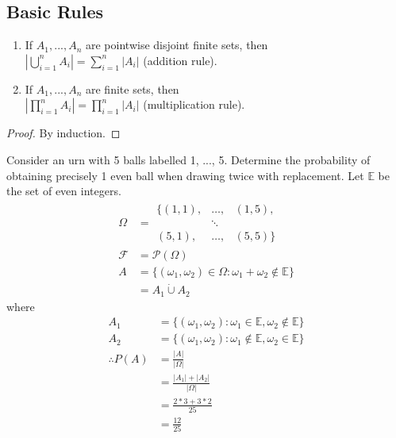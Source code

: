 \documentclass{article}
\begin{document}
	\subsection{Basic Rules}
	
	\begin{myprop}{}{}
		\begin{enumerate}
			\item If $A_1, ..., A_n$ are pointwise disjoint finite sets, then\\
			$|\bigcup_{i=1}^{n}A_i|=\sum_{i=1}^{n}|A_i|$ (addition rule).
			\item If $A_1, ..., A_n$ are finite sets, then\\
			$|\prod_{i=1}^{n}A_i|=\prod_{i=1}^{n}|A_i|$ (multiplication rule).
		\end{enumerate}
		
		\begin{proof}
			By induction.
		\end{proof}
	\end{myprop}
	
	\begin{myex}{}{}
		Consider an urn with 5 balls labelled 1, ..., 5. Determine the probability of obtaining precisely 1 even ball when drawing twice with replacement. Let $\mathbb{E}$ be the set of even integers.
		\begin{align*}
			\Omega&=\begin{matrix}
				\{(1, 1), & \dots, & (1, 5),\\
				& \ddots & \\
				(5, 1), & \dots, & (5, 5)\}
				\end{matrix}\\
			\mathcal{F}&=\mathcal{P}(\Omega)\\
			A&=\{(\omega_1, \omega_2)\in\Omega : \omega_1+\omega_2\notin\mathbb{E}\}\\
			&=A_1\dot\cup A_2
		\end{align*}
		where
		\begin{align*}
			A_1&=\{(\omega_1, \omega_2) : \omega_1\in\mathbb{E}, \omega_2\notin\mathbb{E}\}\\
			A_2&=\{(\omega_1, \omega_2) : \omega_1\notin\mathbb{E}, \omega_2\in\mathbb{E}\}\\
			\therefore P(A)&=\frac{|A|}{|\Omega|}\\
			&=\frac{|A_1|+|A_2|}{|\Omega|}\\
			&=\frac{2*3+3*2}{25}\\
			&=\frac{12}{25}
		\end{align*}
	\end{myex}
	
\end{document}
